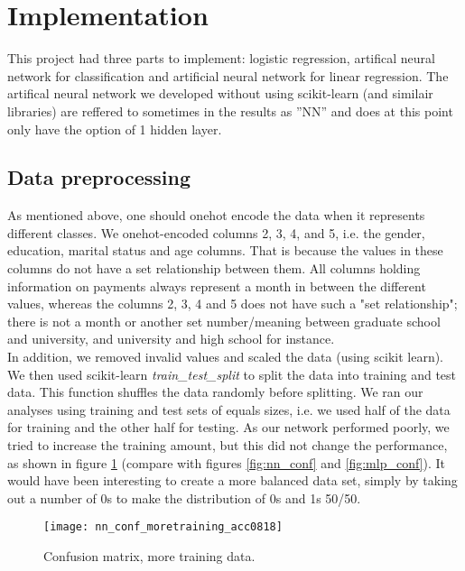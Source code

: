 \documentclass[11pt,english, A4]{article}
\begin{document}
\section{Implementation}

This project had three parts to implement: logistic regression, artifical neural network for classification and artificial neural network for linear regression. The artifical neural network we developed without using scikit-learn (and similair libraries) are reffered to sometimes in the results as ''NN'' and does at this point only have the option of 1 hidden layer.

\subsection{Data preprocessing}
As mentioned above, one should onehot encode the data when it represents different classes. 
We onehot-encoded columns 2, 3, 4, and 5, i.e. the gender, education, marital status and age columns. That is because the values in these columns do not have a set relationship between them. All columns holding information on payments always represent a month in between the different values, whereas the columns 2, 3, 4 and 5 does not have such a "set relationship"; there is not a month or another set number/meaning between graduate school and university, and university and high school for instance. \\

In addition, we removed invalid values and scaled the data (using scikit learn). We then used scikit-learn \textit{train\_test\_split} to split the data into training and test data. This function shuffles the data randomly before splitting. We ran our analyses using training and test sets of equals sizes, i.e. we used half of the data for training and the other half for testing. As our network performed poorly, we tried to increase the training amount, but this did not change the performance, as shown in figure \ref{fig:nn_conf_moretraining_acc0818} (compare with figures \ref{fig:nn_conf} and \ref{fig:mlp_conf}). It would have been interesting to create a more balanced data set, simply by taking out a number of 0s to make the distribution of 0s and 1s 50/50.

\begin{figure}[H]
\begin{center}
  \texttt{[image: nn\_conf\_moretraining\_acc0818]}
  \caption{Confusion matrix, more training data.}
  \label{fig:nn_conf_moretraining_acc0818}
  \end{center}
\end{figure}
\end{document}

